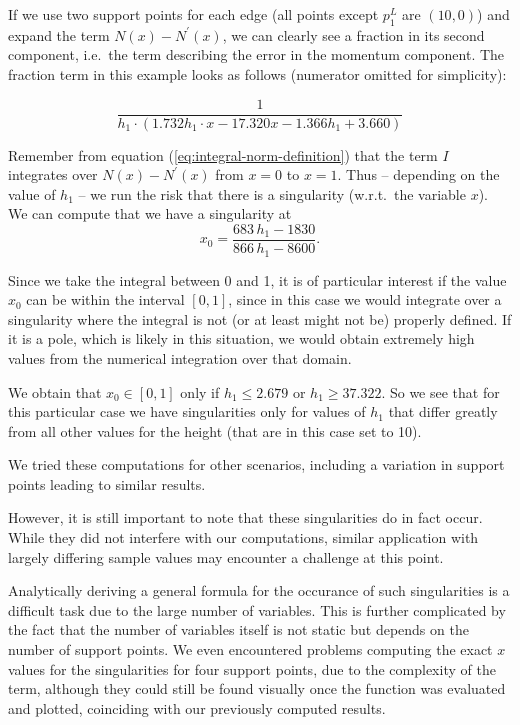 \documentclass{article}
\begin{document}
If we use two support points for each edge (all points except $p_1^L$ are $(10,0)$) and expand the term $N\left(x\right)-N^\prime\left(x\right)$, we can clearly see a fraction in its second component, i.e.\, the term describing the error in the momentum component. The fraction term in this example looks as follows (numerator omitted for simplicity):

\begin{equation*}
  \frac{1}{h_1\cdot(1.732 h_1 \cdot x - 17.320 x - 1.366 h_1 + 3.660)}
\end{equation*}

Remember from equation (\ref{eq:integral-norm-definition}) that the term $I$ integrates over $N\left(x\right)-N^\prime\left(x\right)$ from $x=0$ to $x=1$. Thus -- depending on the value of $h_1$ -- we run the risk that there is a singularity (w.r.t.\, the variable $x$). We can compute that we have a singularity at
\begin{equation*}
  x_0=\frac{683\, h_1 - 1830}{866\, h_1 - 8600}.
\end{equation*}

Since we take the integral between 0 and 1, it is of particular interest if the value $x_0$ can be within the interval $\left[ 0,1 \right]$, since in this case we would integrate over a singularity where the integral is not (or at least might not be) properly defined. If it is a pole, which is likely in this situation, we would obtain extremely high values from the numerical integration over that domain.

We obtain that $x_0 \in \left[ 0,1 \right]$ only if $h_1 \leq 2.679$ or $h_1 \geq 37.322$. So we see that for this particular case we have singularities only for values of $h_1$ that differ greatly from all other values for the height (that are in this case set to 10).

We tried these computations for other scenarios, including a variation in support points leading to similar results.

However, it is still important to note that these singularities do in fact occur. While they did not interfere with our computations, similar application with largely differing sample values may encounter a challenge at this point.

Analytically deriving a general formula for the occurance of such singularities is a difficult task due to the large number of variables. This is further complicated by the fact that the number of variables itself is not static but depends on the number of support points. We even encountered problems computing the exact $x$ values for the singularities for four support points, due to the complexity of the term, although they could still be found visually once the function was evaluated and plotted, coinciding with our previously computed results.
\end{document}
